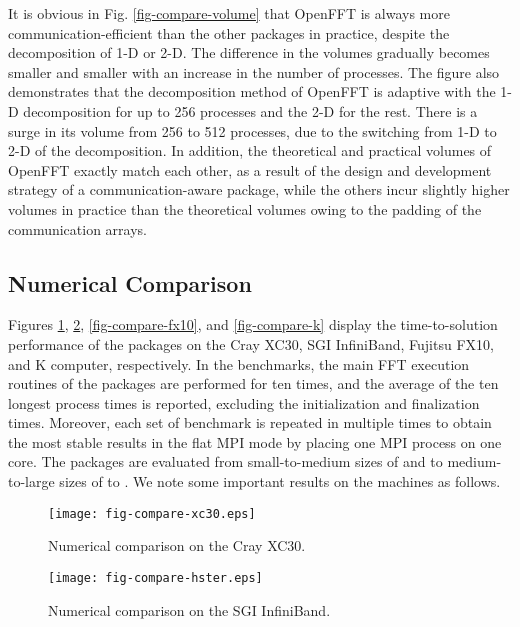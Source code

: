 It is obvious in Fig. \ref{fig-compare-volume} that OpenFFT is always more communication-efficient than the other packages in practice, despite the decomposition of 1-D or 2-D. The difference in the volumes gradually becomes smaller and smaller with an increase in the number of processes. The figure also demonstrates that the decomposition method of OpenFFT is adaptive with the 1-D decomposition for up to 256 processes and the 2-D for the rest. There is a surge in its volume from 256 to 512 processes, due to the switching from 1-D to 2-D of the decomposition. In addition, the theoretical and practical volumes of OpenFFT exactly match each other, as a result of the design and development strategy of a communication-aware package, while the others incur slightly higher volumes in practice than the theoretical volumes owing to the padding of the communication arrays.


\subsection{Numerical Comparison}

Figures \ref{fig-compare-cray}, \ref{fig-compare-hster}, \ref{fig-compare-fx10}, and \ref{fig-compare-k} display the time-to-solution performance of the packages on the Cray XC30, SGI InfiniBand, Fujitsu FX10, and K computer, respectively. In the benchmarks, the main FFT execution routines of the packages are performed for ten times, and the average of the ten longest process times is reported, excluding the initialization and finalization times. Moreover, each set of benchmark is repeated in multiple times to obtain the most stable results in the flat MPI mode by placing one MPI process on one core. The packages are evaluated from small-to-medium sizes of  and  to medium-to-large sizes of  to . 
We note some important results on the machines as follows.

\begin{figure}[htb]
\begin{center}
\texttt{[image: fig-compare-xc30.eps]}
\end{center}
\caption{Numerical comparison on the Cray XC30.}
\label{fig-compare-cray}
\end{figure}

\begin{figure}[htb]
\begin{center}
\texttt{[image: fig-compare-hster.eps]}
\end{center}
\caption{Numerical comparison on the SGI InfiniBand.}
\label{fig-compare-hster}
\end{figure}


